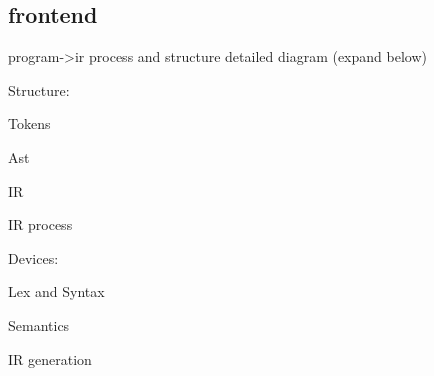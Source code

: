 \subsection{frontend} \label{sec:frontend}

program->ir process and structure detailed diagram (expand below)

Structure:

    Tokens

    Ast

    IR

IR process

Devices:

    Lex and Syntax

    Semantics

    IR generation